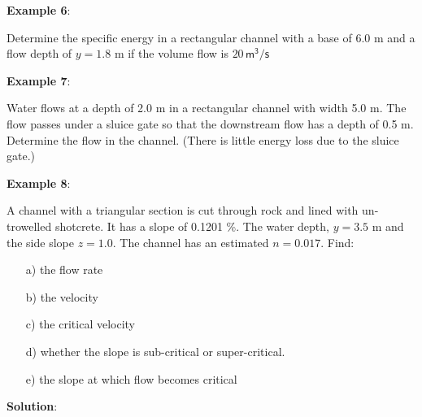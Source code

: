 \documentclass[10pt, oneside]{amsart}
\begin{document}
\par\vfill

\pagebreak


\textbf{Example 6}:

Determine the specific energy in a
rectangular channel with a base of
$6.0$ m and a flow depth of $y = 1.8$ m
if the volume flow is $20 \,\mathsf{m^3/s}$

\par\vfill

\pagebreak


\textbf{Example 7}:


Water flows at a depth of 2.0 m in a rectangular channel with width 5.0 m. The flow passes under a sluice gate so that
the downstream flow has a depth of 0.5 m. Determine the flow in the channel. (There is little energy loss due to the
sluice gate.)

\par\vfill

\pagebreak



\textbf{Example 8}:



A channel with a triangular section is cut through rock and lined with un-trowelled shotcrete. It has a slope of
0.1201 \%.
The water depth, $y=3.5$ m and the side slope $z=1.0$. The channel has an estimated $n=0.017$.
Find:
\begin{itemize}
	\item [a)] the flow rate
	\item [b)] the velocity
	\item [c)] the critical velocity
	\item [d)] whether the slope is sub-critical or super-critical.
	\item [e)] the slope at which flow becomes critical
\end{itemize}


\textbf{Solution}:\\

\end{document}
